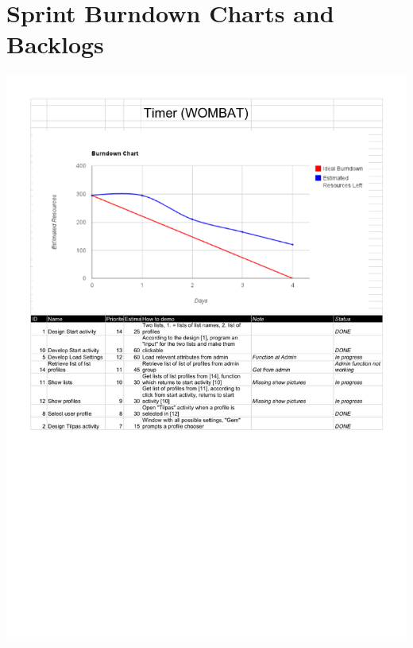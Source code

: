 \section{Sprint Burndown Charts and Backlogs}
\label{sec:burn_back}
	\begin{center}
		\includegraphics[scale=0.5]{Development/burndown_charts/Sprint_1.pdf}

\end{center}
